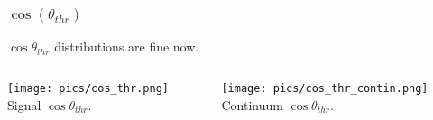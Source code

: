 \documentclass[10 pt,compress,mathserif]{beamer}
\begin{document}
\begin{frame}
 \frametitle{$\cos(\theta_{thr})$}
 \begin{center}
  $\cos{\theta_{thr}}$ distributions are fine now.
 \end{center}

 \begin{columns}
  \begin{column}{0.5\textwidth}
   \begin{center}
    \texttt{[image: pics/cos\_thr.png]}\\
    Signal $\cos{\theta_{thr}}$.
   \end{center}
  \end{column}
  \begin{column}{0.5\textwidth}
   \begin{center}
   \texttt{[image: pics/cos\_thr\_contin.png]}\\
   Continuum $\cos{\theta_{thr}}$.
   \end{center}
  \end{column}
 \end{columns}
\end{frame}
\end{document}
